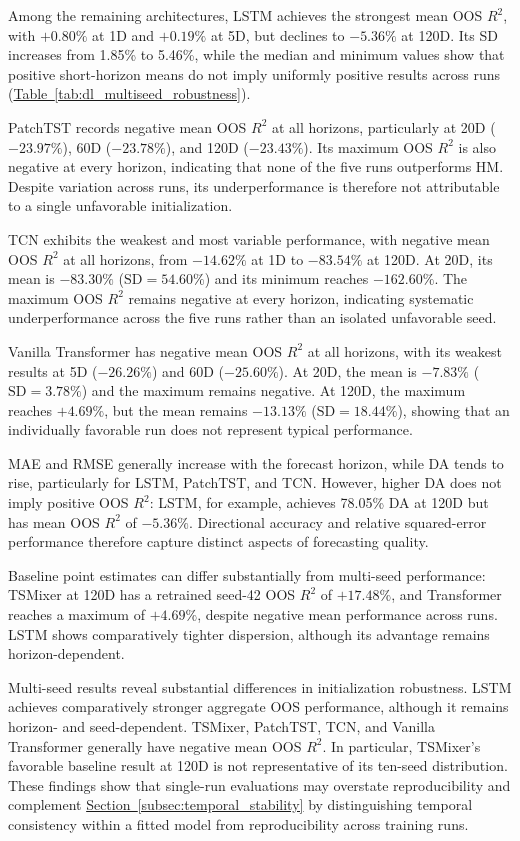 \documentclass[runningheads,orivec]{llncs}
\begin{document}
Among the remaining architectures, LSTM achieves the strongest mean OOS $R^2$, with $+0.80\%$ at 1D and $+0.19\%$ at 5D, but declines to $-5.36\%$ at 120D. Its SD increases from 1.85\% to 5.46\%, while the median and minimum values show that positive short-horizon means do not imply uniformly positive results across runs (\hyperref[tab:dl_multiseed_robustness]{Table~\ref*{tab:dl_multiseed_robustness}}).

PatchTST records negative mean OOS $R^2$ at all horizons, particularly at 20D ($-23.97\%$), 60D ($-23.78\%$), and 120D ($-23.43\%$). Its maximum OOS $R^2$ is also negative at every horizon, indicating that none of the five runs outperforms HM. Despite variation across runs, its underperformance is therefore not attributable to a single unfavorable initialization.

TCN exhibits the weakest and most variable performance, with negative mean OOS $R^2$ at all horizons, from $-14.62\%$ at 1D to $-83.54\%$ at 120D. At 20D, its mean is $-83.30\%$ ($\mathrm{SD}=54.60\%$) and its minimum reaches $-162.60\%$. The maximum OOS $R^2$ remains negative at every horizon, indicating systematic underperformance across the five runs rather than an isolated unfavorable seed.

Vanilla Transformer has negative mean OOS $R^2$ at all horizons, with its weakest results at 5D ($-26.26\%$) and 60D ($-25.60\%$). At 20D, the mean is $-7.83\%$ ($\mathrm{SD}=3.78\%$) and the maximum remains negative. At 120D, the maximum reaches $+4.69\%$, but the mean remains $-13.13\%$ ($\mathrm{SD}=18.44\%$), showing that an individually favorable run does not represent typical performance.

MAE and RMSE generally increase with the forecast horizon, while DA tends to rise, particularly for LSTM, PatchTST, and TCN. However, higher DA does not imply positive OOS $R^2$: LSTM, for example, achieves 78.05\% DA at 120D but has mean OOS $R^2$ of $-5.36\%$. Directional accuracy and relative squared-error performance therefore capture distinct aspects of forecasting quality.

Baseline point estimates can differ substantially from multi-seed performance: TSMixer at 120D has a retrained seed-42 OOS $R^2$ of $+17.48\%$, and Transformer reaches a maximum of $+4.69\%$, despite negative mean performance across runs. LSTM shows comparatively tighter dispersion, although its advantage remains horizon-dependent.

Multi-seed results reveal substantial differences in initialization robustness. LSTM achieves comparatively stronger aggregate OOS performance, although it remains horizon- and seed-dependent. TSMixer, PatchTST, TCN, and Vanilla Transformer generally have negative mean OOS $R^2$. In particular, TSMixer's favorable baseline result at 120D is not representative of its ten-seed distribution. These findings show that single-run evaluations may overstate reproducibility and complement \hyperref[subsec:temporal_stability]{Section~\ref*{subsec:temporal_stability}} by distinguishing temporal consistency within a fitted model from reproducibility across training runs.
\end{document}
